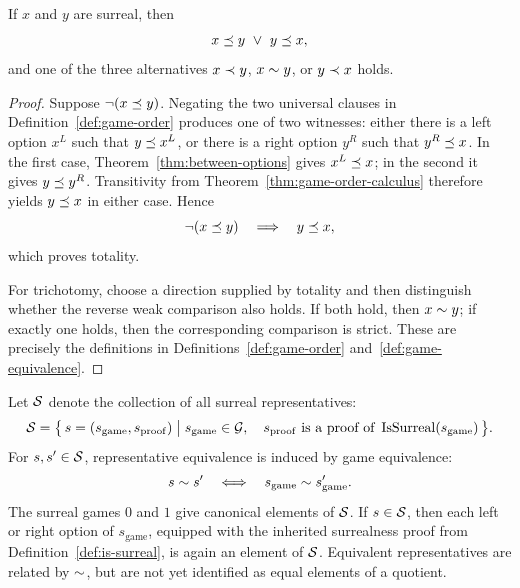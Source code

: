 \begin{theorem}
  \label{thm:surreal-totality}
  \leanok
  If \(x\) and \(y\) are surreal, then
  \[
    x\GameLe y\ \vee\ y\GameLe x,
  \]
  and one of the three alternatives \(x\prec y\), \(x\sim y\), or
  \(y\prec x\) holds.
\end{theorem}
\begin{proof}
  \leanok
  Suppose \(\neg(x\preceq y)\).  Negating the two universal clauses in
  Definition~\ref{def:game-order} produces one of two witnesses: either there
  is a left option \(x^L\) such that \(y\preceq x^L\), or there is a right
  option \(y^R\) such that \(y^R\preceq x\).  In the first case,
  Theorem~\ref{thm:between-options} gives \(x^L\preceq x\); in the second it
  gives \(y\preceq y^R\).  Transitivity from
  Theorem~\ref{thm:game-order-calculus} therefore yields \(y\preceq x\) in
  either case.  Hence
  \[
    \neg(x\preceq y)\quad\Longrightarrow\quad y\preceq x,
  \]
  which proves totality.

  For trichotomy, choose a direction supplied by totality and then distinguish
  whether the reverse weak comparison also holds.  If both hold, then
  \(x\sim y\); if exactly one holds, then the corresponding comparison is
  strict.  These are precisely the definitions in
  Definitions~\ref{def:game-order} and~\ref{def:game-equivalence}.
\end{proof}

\begin{definition}
  \label{def:surreal-representative}
  \leanok
  Let \(\mathcal{S}\) denote the collection of all surreal representatives:
  \[
    \mathcal{S}
      =\bigl\{\,s=(s_{\mathrm{game}},s_{\mathrm{proof}})
        \bigm|
        s_{\mathrm{game}}\in\mathcal{G},\quad
        s_{\mathrm{proof}}\text{ is a proof of }
        \operatorname{IsSurreal}(s_{\mathrm{game}})\,\bigr\}.
  \]
  For \(s,s'\in\mathcal{S}\), representative equivalence is induced by game equivalence:
  \[
    s\sim s'
      \quad\Longleftrightarrow\quad
    s_{\mathrm{game}}\sim s'_{\mathrm{game}}.
  \]
  The surreal games \(0\) and \(1\) give canonical elements of \(\mathcal{S}\).  If
  \(s\in\mathcal{S}\), then each left or right option of \(s_{\mathrm{game}}\), equipped with
  the inherited surrealness proof from Definition~\ref{def:is-surreal}, is again an element of
  \(\mathcal{S}\).  Equivalent representatives are related by \(\sim\), but are not yet
  identified as equal elements of a quotient.
\end{definition}

